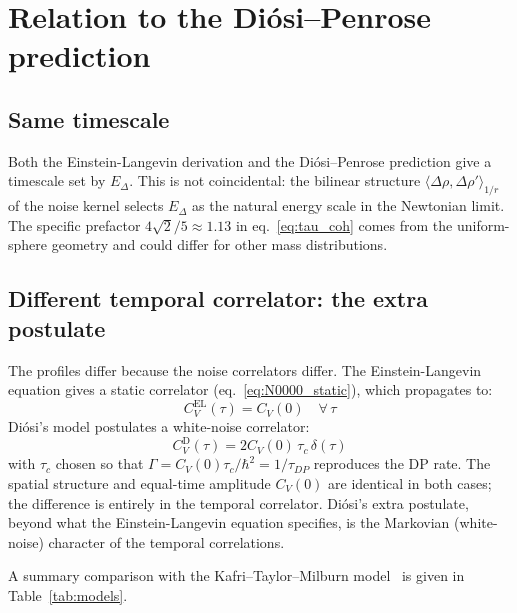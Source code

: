 \documentclass[12pt,a4paper]{article}
\theoremstyle{remark}
\begin{document}
\section{Relation to the Di\'osi--Penrose prediction}
\label{sec:dp_comparison}

\subsection{Same timescale}

Both the Einstein-Langevin derivation and the Di\'osi--Penrose prediction give a timescale
set by $E_\Delta$. This is not coincidental: the bilinear structure $\langle\Delta\rho,\Delta\rho'\rangle_{1/r}$
of the noise kernel selects $E_\Delta$ as the natural energy scale in the Newtonian limit. The specific prefactor
$4\sqrt{2}/5 \approx 1.13$ in eq.~\eqref{eq:tau_coh} comes from the uniform-sphere
geometry and could differ for other mass distributions.

\subsection{Different temporal correlator: the extra postulate}

The profiles differ because the noise correlators differ. The Einstein-Langevin equation
gives a static correlator (eq.~\ref{eq:N0000_static}), which propagates to:
\begin{equation}
C_V^{\text{EL}}(\tau) = C_V(0) \quad \forall\,\tau
\label{eq:corr_el}
\end{equation}
Di\'osi's model postulates a white-noise correlator:
\begin{equation}
C_V^{\text{D}}(\tau) = 2C_V(0)\,\tau_c\,\delta(\tau)
\label{eq:corr_diosi}
\end{equation}
with $\tau_c$ chosen so that $\Gamma = C_V(0)\tau_c/\hbar^2 = 1/\tau_{DP}$ reproduces
the DP rate. The spatial structure and equal-time amplitude $C_V(0)$ are identical in both
cases; the difference is entirely in the temporal correlator. Di\'osi's extra postulate,
beyond what the Einstein-Langevin equation specifies, is the Markovian (white-noise)
character of the temporal correlations.

A summary comparison with the Kafri--Taylor--Milburn model~\cite{kafri} is given in
Table~\ref{tab:models}.
\end{document}
